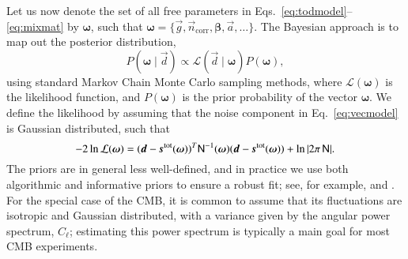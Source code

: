 \documentclass[twocolumn]{aa}
\renewcommand{\d}[0]{\vec{d}}
\newcommand{\s}[0]{\vec{s}}
\renewcommand{\a}[0]{\vec{a}}
\newcommand{\g}[0]{\vec{g}}
\newcommand{\N}[0]{\tens{N}}
\newcommand{\ncorr}{\vec n_\mathrm{corr}}
\begin{document}
Let us now denote the set of all free parameters in
Eqs.~\eqref{eq:todmodel}--\eqref{eq:mixmat} by $\boldsymbol \omega$, such that
$\boldsymbol \omega = \{\g, \ncorr, \boldsymbol\beta, \a, \ldots\}$. The Bayesian approach is
to map out the posterior distribution, 
\begin{equation}\label{eq:full_distribution}
	P(\boldsymbol \omega\mid\d) \propto \mathcal{L}(\d\mid\boldsymbol \omega) P(\boldsymbol \omega),
\end{equation}
using standard Markov Chain Monte Carlo sampling methods, where
$\mathcal{L}(\boldsymbol \omega)$ is the likelihood function, and
$P(\boldsymbol \omega)$ is the prior probability of the vector $\boldsymbol
\omega$. We define the likelihood by assuming that the noise component in
Eq.~\eqref{eq:vecmodel} is Gaussian distributed, such that
\begin{equation}
	-2\ln\mathcal{L}(\boldsymbol \omega) = (\d-\s^{\mathrm{tot}}(\boldsymbol \omega))^T\N^{-1}(\boldsymbol \omega)(\d-\s^{\mathrm{tot}}(\boldsymbol \omega)) + \ln|2\pi\,\mathsf N|.
\end{equation}
The priors are in general less well-defined, and in practice we use both
algorithmic and informative priors to ensure a robust fit; see, for example,
\citet{bp01} and \citet{bp13}. For the special case of the CMB, it is common to
assume that its fluctuations are isotropic and Gaussian distributed, with a
variance given by the angular power spectrum, $C_{\ell}$; estimating this power
spectrum is typically a main goal for most CMB experiments.
\end{document}
